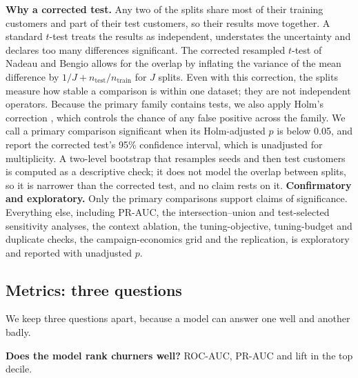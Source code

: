 \documentclass[11pt]{article}
\begin{document}
\textbf{Why a corrected test.} Any two of the \nSeeds{} splits share most of their training customers and part of their
test customers, so their results move together. A standard $t$-test treats the \nSeeds{} results as independent,
understates the uncertainty and declares too many differences significant. The corrected resampled $t$-test of Nadeau
and Bengio \cite{nadeau2003inference} allows for the overlap by inflating the variance of the mean difference by
$1/J + n_\mathrm{test}/n_\mathrm{train}$ for $J$ splits. Even with this correction, the \nSeeds{} splits measure how
stable a comparison is within one dataset; they are not \nSeeds{} independent operators. Because the primary family
contains \nPrimary{} tests, we also apply Holm's correction \cite{holm1979simple}, which controls the chance of any false
positive across the family. We call a primary comparison significant when its Holm-adjusted $p$ is below 0.05, and report the
corrected test's 95\% confidence interval, which is unadjusted for multiplicity. A two-level bootstrap that resamples
seeds and then test customers is computed as a descriptive check; it does not model the overlap between splits, so it
is narrower than the corrected test, and no claim rests on it.
\textbf{Confirmatory and exploratory.} Only the \nPrimary{} primary comparisons support claims of significance.
Everything else, including PR-AUC, the intersection--union and test-selected sensitivity analyses, the context
ablation, the tuning-objective, tuning-budget and duplicate checks, the campaign-economics grid and the replication, is exploratory and
reported with unadjusted $p$.

\subsection{Metrics: three questions}\label{sec:metrics}
We keep three questions apart, because a model can answer one well and another badly.

\textbf{Does the model rank churners well?} ROC-AUC, PR-AUC and lift in the top decile.
\end{document}
